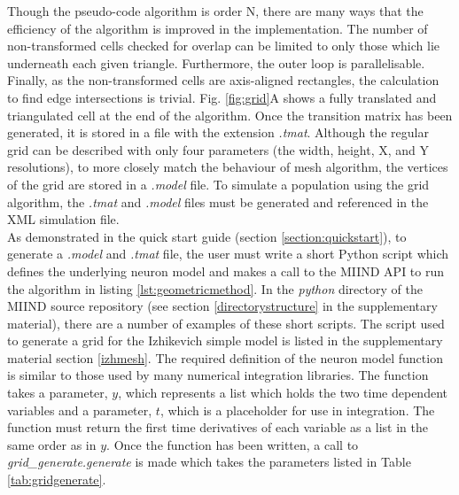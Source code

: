 \documentclass[utf8]{frontiersSCNS} %
\begin{document}
Though the pseudo-code algorithm is order N\texttwosuperior, there are many ways that the efficiency of the algorithm is improved in the implementation. The number of non-transformed cells checked for overlap can be limited to only those which lie underneath each given triangle. Furthermore, the outer loop is parallelisable. Finally, as the non-transformed cells are axis-aligned rectangles, the calculation to find edge intersections is trivial. Fig. \ref{fig:grid}A shows a fully translated and triangulated cell at the end of the algorithm. Once the transition matrix has been generated, it is stored in a file with the extension \textit{.tmat}. Although the regular grid can be described with only four parameters (the width, height, X, and Y resolutions), to more closely match the behaviour of mesh algorithm, the vertices of the grid are stored in a \textit{.model} file. To simulate a population using the grid algorithm, the \textit{.tmat} and \textit{.model} files must be generated and referenced in the XML simulation file.\\

As demonstrated in the quick start guide (section \ref{section:quickstart}), to generate a \textit{.model} and \textit{.tmat} file, the user must write a short Python script which defines the underlying neuron model and makes a call to the MIIND API to run the algorithm in listing \ref{lst:geometricmethod}. In the \textit{python} directory of the MIIND source repository (see section \ref{directorystructure} in the supplementary material), there are a number of examples of these short scripts. The script used to generate a grid for the Izhikevich simple model is listed in the supplementary material section \ref{izhmesh}. The required definition of the neuron model function is similar to those used by many numerical integration libraries. The function takes a parameter, $y$, which represents a list which holds the two time dependent variables and a parameter, $t$, which is a placeholder for use in integration. The function must return the first time derivatives of each variable as a list in the same order as in $y$. Once the function has been written, a call to \textit{grid\_generate.generate} is made which takes the parameters listed in Table \ref{tab:gridgenerate}. 
\end{document}

